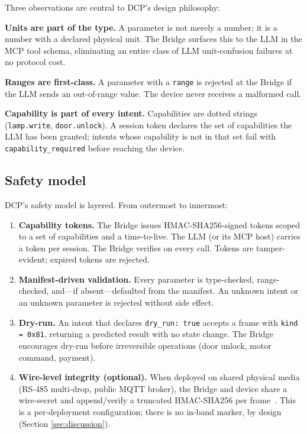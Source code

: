 \documentclass[11pt,a4paper]{article}
\begin{document}
\noindent
Three observations are central to DCP's design philosophy:

\textbf{Units are part of the type.} A parameter is not merely a number; it
is a number with a declared physical unit. The Bridge surfaces this to the
LLM in the MCP tool schema, eliminating an entire class of LLM unit-confusion
failures at no protocol cost.

\textbf{Ranges are first-class.} A parameter with a \texttt{range} is
rejected at the Bridge if the LLM sends an out-of-range value. The device
never receives a malformed call.

\textbf{Capability is part of every intent.} Capabilities are dotted
strings (\texttt{lamp.write}, \texttt{door.unlock}). A session token
declares the set of capabilities the LLM has been granted; intents whose
capability is not in that set fail with \texttt{capability\_required}
before reaching the device.

\subsection{Safety model}\label{sec:safety}

DCP's safety model is layered. From outermost to innermost:

\begin{enumerate}[leftmargin=*,nosep]
  \item \textbf{Capability tokens.} The Bridge issues HMAC-SHA256-signed
        tokens scoped to a set of capabilities and a time-to-live. The
        LLM (or its MCP host) carries a token per session. The Bridge
        verifies on every call. Tokens are tamper-evident; expired tokens
        are rejected.
  \item \textbf{Manifest-driven validation.} Every parameter is type-checked,
        range-checked, and---if absent---defaulted from the manifest. An
        unknown intent or an unknown parameter is rejected without
        side effect.
  \item \textbf{Dry-run.} An intent that declares \texttt{dry\_run: true}
        accepts a frame with \texttt{kind = 0x81}, returning a predicted
        result with no state change. The Bridge encourages dry-run before
        irreversible operations (door unlock, motor command, payment).
  \item \textbf{Wire-level integrity (optional).} When deployed on shared
        physical media (RS-485 multi-drop, public MQTT broker), the Bridge
        and device share a wire-secret and append/verify a truncated
        HMAC-SHA256 per frame~\cite{rfc2104,fips180}. This is a per-deployment
        configuration; there is no in-band marker, by design (Section
        \ref{sec:discussion}).
\end{enumerate}
\end{document}
